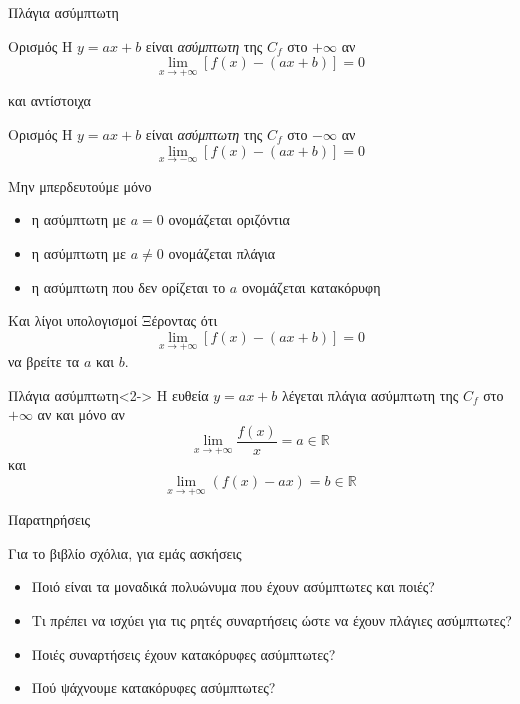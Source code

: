 \documentclass{../presentation}
\begin{document}
\begin{frame}{Πλάγια ασύμπτωτη}
  \begin{block}{Ορισμός}
    Η $y=ax+b$ είναι \emph{ασύμπτωτη} της $C_f$ στο $+\infty$ αν $$\lim\limits_{x \to +\infty}{ [f(x)-(ax+b)] }=0$$
  \end{block}
  και αντίστοιχα
  \begin{block}{Ορισμός}
    Η $y=ax+b$ είναι \emph{ασύμπτωτη} της $C_f$ στο $-\infty$ αν $$\lim\limits_{x \to -\infty}{ [f(x)-(ax+b)] }=0$$
  \end{block}
\end{frame}

\begin{frame}{Μην μπερδευτούμε μόνο}
  \begin{itemize}
    \item<1-> η ασύμπτωτη με $a=0$ ονομάζεται οριζόντια
    \item<2-> η ασύμπτωτη με $a\ne 0$ ονομάζεται πλάγια
    \item<3-> η ασύμπτωτη που δεν ορίζεται το $a$ ονομάζεται κατακόρυφη
  \end{itemize}
\end{frame}

\begin{frame}{Και λίγοι υπολογισμοί}
  Ξέροντας ότι
  $$\lim\limits_{x \to +\infty}{ [f(x)-(ax+b)] }=0$$
  να βρείτε τα $a$ και $b$.
  \begin{block}{Πλάγια ασύμπτωτη}<2->
    Η ευθεία $y=ax+b$ λέγεται πλάγια ασύμπτωτη της $C_f$ στο $+\infty$ αν και μόνο αν
    $$\lim\limits_{x \to +\infty}{ \dfrac{f(x)}{x} }=a\in\mathbb{R}$$
    και
    $$\lim\limits_{x \to +\infty}{ (f(x)-ax) }=b\in\mathbb{R}$$
  \end{block}
\end{frame}

\begin{frame}{Παρατηρήσεις}

  Για το βιβλίο σχόλια, για εμάς ασκήσεις

  \begin{itemize}
    \item<1-> Ποιό είναι τα μοναδικά πολυώνυμα που έχουν ασύμπτωτες και ποιές?
    \item<2-> Τι πρέπει να ισχύει για τις ρητές συναρτήσεις ώστε να έχουν πλάγιες ασύμπτωτες?
    \item<3-> Ποιές συναρτήσεις έχουν κατακόρυφες ασύμπτωτες?
    \item<4-> Πού ψάχνουμε κατακόρυφες ασύμπτωτες?
  \end{itemize}

\end{frame}
\end{document}
